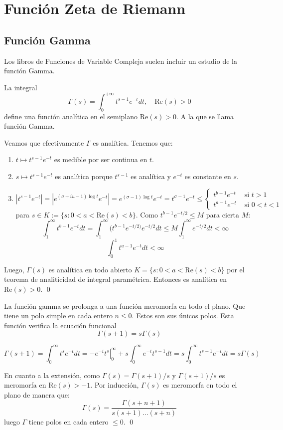 \documentclass[TAN.tex]{subfiles}
\begin{document}
\chapter{Función Zeta de Riemann}
\section{Función Gamma}
Los libros de Funciones de Variable Compleja suelen incluir un estudio de la función Gamma.
\begin{defi}
La integral
\[ Γ(s) = \int_0^{+∞} t^{s-1}e^{-t} dt, \quad \text{Re}(s)>0 \]
define una función analítica en el semiplano $\text{Re}(s)>0$. A la que se llama función Gamma.
\end{defi}
\begin{dem}
Veamos que efectivamente $Γ$ es analítica. Tenemos que:
\begin{enumerate}
\item $t\mapsto t^{s-1}e^{-t}$ es medible por ser continua en $t$.
\item $s\mapsto t^{s-1}e^{-t}$ es analítica porque $t^{s-1}$ es analítica y $e^{-t}$ es constante en $s$.
\item 
\[ |t^{s-1}e^{-t}| = |e^{(σ+iu-1)\log t}e^{-t}| = e^{(σ-1)\log t}e^{-t} = t^{σ-1}e^{-t} ≤ \begin{cases}
	t^{b-1}e^{-t} &\text{ si }t>1\\
	t^{a-1}e^{-t} &\text{ si }0<t<1
\end{cases}\] 
para $s \in K := \{s : 0 < a < \text{Re}(s) < b\}$. Como $t^{b-1}e^{-t/2} ≤ M$ para cierta $M$:
\[ \int_1^{∞}t^{b-1}e^{-t}dt = \int_1^{∞}(t^{b-1}e^{-t/2)}e^{-t/2}dt ≤ M \int_1^{∞} e^{-t/2}dt < ∞ \]
\[ \int_0^1 t^{a-1}e^{-t} dt < ∞ \]
\end{enumerate}
Luego, $Γ(s)$ es analítica en todo abierto $K=\{s : 0 < a < \text{Re}(s) < b\}$ por el teorema de analiticidad de integral paramétrica.
Entonces es analítica en $\text{Re}(s) > 0$.
\qed
\end{dem}

\begin{prop}
La función gamma se prolonga a una función meromorfa en todo el plano. Que tiene un polo simple en cada entero $n ≤ 0$. Estos son sus únicos polos. Esta función verifica la ecuación funcional
\[ Γ(s+1) = sΓ(s) \]
\end{prop}

\begin{dem}
\[
Γ(s+1) = \int_0^{∞} t^s e^{-t} dt = \left.-e^{-t}t^s\right|_0^{∞} + s\int_0^{∞}e^{-t}t^{s-1}dt = s\int_0^{∞}t^{s-1}e^{-t}dt = s Γ(s)
\]

En cuanto a la extensión, como $Γ(s)=Γ(s+1)/s$ y $Γ(s+1)/s$ es meromorfa en $\text{Re}(s)>-1$. Por inducción, $Γ(s)$ es meromorfa en todo el plano de manera que:
\[ Γ(s) = \frac{Γ(s+n+1)}{s(s+1)\dots(s+n)}\]
luego $Γ$ tiene polos en cada entero $≤0$.
\qed
\end{dem}
\end{document}
